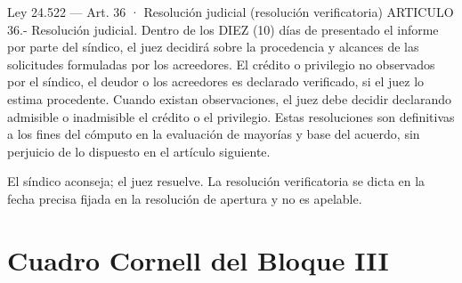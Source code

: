 \documentclass[12pt,oneside]{book}
\begin{document}
\begin{legal}{Ley 24.522 — Art. 36 · Resolución judicial (resolución verificatoria)}
ARTICULO 36.- Resolución judicial. Dentro de los DIEZ (10) días de presentado el informe por parte del síndico, el juez decidirá sobre la procedencia y alcances de las solicitudes formuladas por los acreedores. El crédito o privilegio no observados por el síndico, el deudor o los acreedores es declarado verificado, si el juez lo estima procedente. Cuando existan observaciones, el juez debe decidir declarando admisible o inadmisible el crédito o el privilegio. Estas resoluciones son definitivas a los fines del cómputo en la evaluación de mayorías y base del acuerdo, sin perjuicio de lo dispuesto en el artículo siguiente.
\end{legal}

El síndico aconseja; el juez resuelve. La resolución verificatoria se dicta en la fecha precisa fijada en la resolución de apertura y no es apelable.

\section{Cuadro Cornell del Bloque III}
\end{document}
